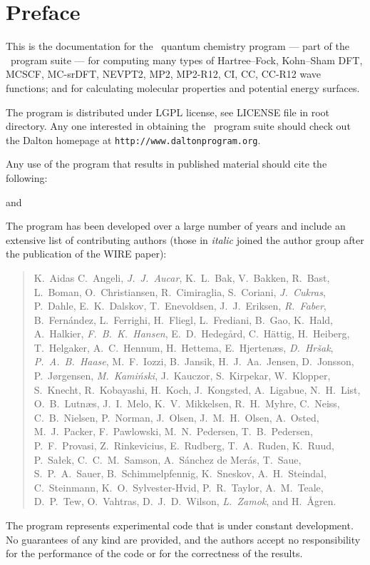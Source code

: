 \tableofcontents

\chapter*{Preface}

This is the documentation for the \dalton\ quantum chemistry program
--- part of the \latestrelease\ program suite ---
for computing many types of Hartree--Fock, Kohn--Sham DFT, 
MCSCF, MC-srDFT, NEVPT2, MP2, MP2-R12, CI, CC, CC-R12 wave functions;
and for calculating molecular properties and potential energy surfaces.


The program is distributed under LGPL license, see LICENSE file in root directory.
Any one interested in obtaining the \latestrelease\ program suite
should check out the Dalton homepage at \verb|http://www.daltonprogram.org|.

Any use of the program that results in published
material should cite the following:
\begin{quote}
\end{quote}
and
\begin{quote}
\end{quote}

The program has been developed over a large number of years and
include an extensive list of contributing authors
(those in {\em italic} joined the author group after the publication of the WIRE paper):

\begin{quote}\raggedright
K.~Aidas
C.~Angeli,
{\em J.~J.~Aucar},
K.~L.~Bak,
V.~Bakken,
R.~Bast,
L.~Boman,
O.~Christiansen,
R.~Cimiraglia,
S.~Coriani,
{\em J.~Cukras},
P.~Dahle,
E.~K.~Dalskov,
T.~Enevoldsen,
J.~J.~Eriksen,
{\em R.~Faber},
B.~Fern\'{a}ndez,
L.~Ferrighi,
H.~Fliegl,
L.~Frediani,
B.~Gao,
K.~Hald,
A.~Halkier,
{\em F.~B.~K.~Hansen},
E.~D.~Hedeg\aa{}rd,
C.~H{\"a}ttig,
H.~Heiberg,
T.~Helgaker,
A.~C.~Hennum,
H.~Hettema,
E.~Hjerten\ae{}s,
{\em D.~Hr\v{s}ak},
{\em P.~A.~B.~Haase},
M.~F.~Iozzi,
B.~Jansik,
H.~J.~Aa.~Jensen,
D.~Jonsson,
P.~J{\o}rgensen,
{\em M.~Kami{\'n}ski},
J.~Kauczor,
S.~Kirpekar,
W.~Klopper,
S.~Knecht,
R.~Kobayashi,
H.~Koch,
J.~Kongsted,
A.~Ligabue,
N.~H.~List,
O.~B.~Lutn\ae{}s,
J.~I.~Melo,
K.~V.~Mikkelsen,
R.~H.~Myhre,
C.~Neiss,
C.~B.~Nielsen,
P.~Norman,
J.~Olsen,
J.~M.~H.~Olsen,
A.~Osted,
M.~J.~Packer,
F.~Pawlowski,
M.~N.~Pedersen,
T.~B.~Pedersen,
P.~F.~Provasi,
Z.~Rinkevicius,
E.~Rudberg,
T.~A.~Ruden,
K.~Ruud,
P.~Sa\l{}ek,
C.~C.~M.~Samson,
A.~S\'{a}nchez de Mer\'{a}s,
T.~Saue,
S.~P.~A.~Sauer,
B.~Schimmelpfennig,
K.~Sneskov,
A.~H.~Steindal,
C.~Steinmann,
K.~O.~Sylvester-Hvid,
P.~R.~Taylor,
A.~M.~Teale,
D.~P.~Tew,
O.~Vahtras,
D.~J.~D.~Wilson,
{\em L.~Zamok},
and H.~{\AA}gren.
\end{quote}

          The program represents experimental code that is
under constant development.  No guarantees of any kind are
provided, and the authors accept no responsibility for the
performance of the code or for the correctness of the results.
